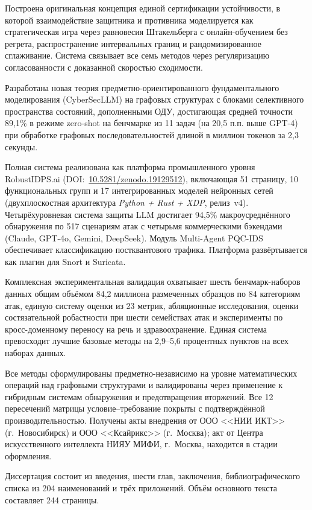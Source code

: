 Построена оригинальная концепция единой сертификации устойчивости, в которой взаимодействие защитника и противника моделируется как стратегическая игра через равновесия Штакельберга с онлайн-обучением без регрета, распространение интервальных границ и рандомизированное сглаживание. Система связывает все семь методов через регуляризацию согласованности с доказанной скоростью сходимости.

Разработана новая теория предметно-ориентированного фундаментального моделирования (CyberSecLLM) на графовых структурах с блоками селективного пространства состояний, дополненными ОДУ, достигающая средней точности 89,1\% в режиме zero-shot на бенчмарке из 11 задач (на 20,5 п.п. выше GPT-4) при обработке графовых последовательностей длиной в миллион токенов за 2,3 секунды.

Полная система реализована как платформа промышленного уровня RobustIDPS.ai (DOI:~\url{10.5281/zenodo.19129512}), включающая 51 страницу, 10 функциональных групп и 17 интегрированных моделей нейронных сетей (двухплоскостная архитектура \emph{Python + Rust + XDP}, релиз~v4). Четырёхуровневая система защиты LLM достигает 94,5\% макроусреднённого обнаружения по 517 сценариям атак с четырьмя коммерческими бэкендами (Claude, GPT-4o, Gemini, DeepSeek). Модуль Multi-Agent PQC-IDS обеспечивает классификацию постквантового трафика. Платформа развёртывается как плагин для Snort и Suricata.

Комплексная экспериментальная валидация охватывает шесть бенчмарк-наборов данных общим объёмом 84,2 миллиона размеченных образцов по 84 категориям атак, единую систему оценки из 23 метрик, абляционные исследования, оценки состязательной робастности при шести семействах атак и эксперименты по кросс-доменному переносу на речь и здравоохранение. Единая система превосходит лучшие базовые методы на 2,9--5,6 процентных пунктов на всех наборах данных.

Все методы сформулированы предметно-независимо на уровне математических операций над графовыми структурами и валидированы через применение к гибридным системам обнаружения и предотвращения вторжений. Все 12 пересечений матрицы условие--требование покрыты с подтверждённой производительностью. Получены акты внедрения от ООО <<НИИ ИКТ>> (г.~Новосибирск) и ООО <<Ксайрикс>> (г.~Москва); акт от Центра искусственного интеллекта НИЯУ МИФИ, г.~Москва, находится в стадии оформления.

Диссертация состоит из введения, шести глав, заключения, библиографического списка из 204 наименований и трёх приложений. Объём основного текста составляет 244 страницы.

